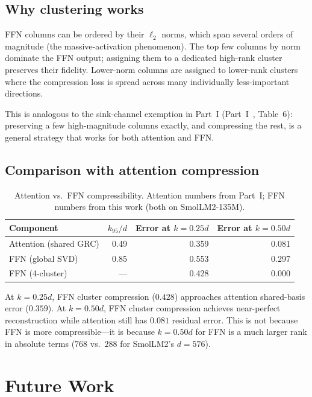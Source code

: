 \documentclass[11pt]{article}
\begin{document}
\subsection{Why clustering works}

FFN columns can be ordered by their $\ell_2$ norms, which span several
orders of magnitude (the massive-activation phenomenon).  The top few
columns by norm dominate the FFN output; assigning them to a dedicated
high-rank cluster preserves their fidelity.  Lower-norm columns are
assigned to lower-rank clusters where the compression loss is spread
across many individually less-important directions.

This is analogous to the sink-channel exemption in Part~I
(Part~I~\cite{stewart2026grc}, Table~6): preserving a few high-magnitude columns
exactly, and compressing the rest, is a general strategy that works
for both attention and FFN.

\subsection{Comparison with attention compression}

\begin{table}[h]\centering\small
\caption{Attention vs.\ FFN compressibility.  Attention numbers from
Part~I; FFN numbers from this work (both on SmolLM2-135M).}
\label{tab:attn-vs-ffn}
\begin{tabular}{@{}lrrr@{}}
\toprule
Component & $k_{95}/d$ & Error at $k{=}0.25d$ & Error at $k{=}0.50d$ \\
\midrule
Attention (shared GRC)  & 0.49 & 0.359 & 0.081 \\
FFN (global SVD)        & 0.85 & 0.553 & 0.297 \\
FFN (4-cluster)         & ---  & 0.428 & 0.000 \\
\bottomrule
\end{tabular}
\end{table}

At $k{=}0.25d$, FFN cluster compression ($0.428$) approaches attention
shared-basis error ($0.359$).  At $k{=}0.50d$, FFN cluster compression
achieves near-perfect reconstruction while attention still has $0.081$
residual error.  This is not because FFN is more compressible---it is
because $k{=}0.50d$ for FFN is a much larger rank in absolute terms
($768$ vs.\ $288$ for SmolLM2's $d{=}576$).

\section{Future Work}
\label{sec:future}
\end{document}
